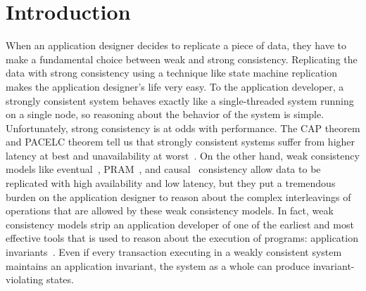 \section{Introduction}
When an application designer decides to replicate a piece of data, they have to
make a fundamental choice between weak and strong consistency. Replicating the
data with strong consistency using a technique like state machine
replication~\cite{schneider1990implementing, lamport1998part,
liskov2012viewstamped, ongaro2014search} makes the application designer's life
very easy. To the application developer, a strongly consistent system behaves
exactly like a single-threaded system running on a single node, so reasoning
about the behavior of the system is simple. Unfortunately, strong consistency
is at odds with performance. The CAP theorem and PACELC theorem tell us that
strongly consistent systems suffer from higher latency at best and
unavailability at worst~\cite{brewer2012cap, abadi2012consistency}. On the
other hand, weak consistency models like eventual~\cite{vogels2009eventually},
PRAM~\cite{lipton1988pram}, and causal~\cite{ahamad1995causal} consistency
allow data to be replicated with high availability and low latency, but they
put a tremendous burden on the application designer to reason about the complex
interleavings of operations that are allowed by these weak consistency models.
In fact, weak consistency models strip an application developer of one of the
earliest and most effective tools that is used to reason about the execution of
programs: application invariants~\cite{hoare1969axiomatic}. Even if every
transaction executing in a weakly consistent system maintains an application
invariant, the system as a whole can produce invariant-violating states.


